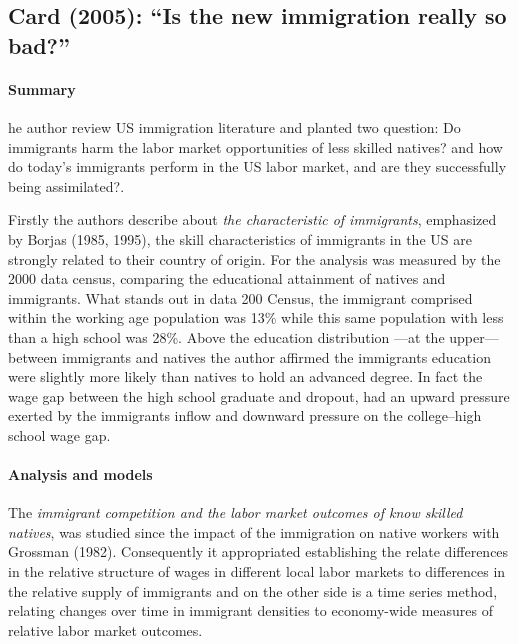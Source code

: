 \documentclass[11pt]{article}
\theoremstyle{prop}
\begin{document}
	
	
	\subsection{Card (2005): ``Is the new immigration really so bad?''}
	
	\paragraph{Summary} he author review US immigration literature and planted two question: Do immigrants harm the labor market opportunities of less skilled natives? and how do today’s immigrants perform in the US labor market, and are they successfully being assimilated?.
		
	Firstly the authors describe about \textit{the characteristic of immigrants}, emphasized by {\color{blue} Borjas (1985, 1995)}, the skill characteristics of immigrants in the US are strongly related to their country of origin. For the analysis was measured by the 2000 data census, comparing the educational attainment of natives and immigrants. What stands out in data 200 Census, the immigrant comprised within the working age population was 13\% while this same population with less than a high school was 28\%. Above the education distribution ---at the upper--- between immigrants and natives the author affirmed the immigrants education were slightly more likely than natives to hold an advanced degree. In fact the wage gap between the high school graduate and dropout, had an upward pressure exerted by the immigrants inflow and downward pressure on the college–high school wage gap.
	
	\paragraph{Analysis and models}
	
	The \textit{immigrant competition and the labor market outcomes of know skilled natives}, was studied since the impact of the immigration on native workers with {\color{blue} Grossman (1982)}. Consequently it appropriated establishing the relate differences in the relative structure of wages in different local labor markets to differences in the relative supply of immigrants and on the other side is a time series method, relating changes over time in immigrant densities to economy-wide measures of relative labor market outcomes.
	
\end{document}
